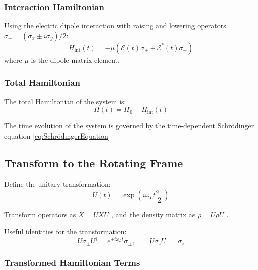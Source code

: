 \subsubsection{Interaction Hamiltonian}
Using the electric dipole interaction with raising and lowering operators \(\sigma_\pm = (\sigma_x \pm i\sigma_y)/2\):
\begin{equation}
	H_{\text{int}}(t) = -\mu \left( \mathcal{E}(t) \sigma_+ + \mathcal{E}^*(t) \sigma_- \right)
	\label{eq:InteractionHamiltonianDipole}
\end{equation}
where \(\mu\) is the dipole matrix element.

\subsubsection{Total Hamiltonian}
The total Hamiltonian of the system is:
\begin{equation}
	H(t) = H_0 + H_{\text{int}}(t)
	\label{eq:TotalHamiltonian}
\end{equation}

The time evolution of the system is governed by the time-dependent Schrödinger equation \eqref{eq:SchrödingerEquation}

\subsection{Transform to the Rotating Frame}

Define the unitary transformation:
\begin{equation}
	U(t) = \exp\left(i \omega_L t \frac{\sigma_z}{2}\right)
	\label{eq:UnitaryRotatingFrame}
\end{equation}

Transform operators as \(\tilde{X} = U X U^\dagger\), and the density matrix as \(\tilde{\rho} = U \rho U^\dagger\).

Useful identities for the transformation:
\begin{equation}
	U \sigma_\pm U^\dagger = e^{\pm i \omega_L t} \sigma_\pm, \qquad
	U \sigma_z U^\dagger = \sigma_z
	\label{eq:TransformationIdentities}
\end{equation}

\subsubsection{Transformed Hamiltonian Terms}


